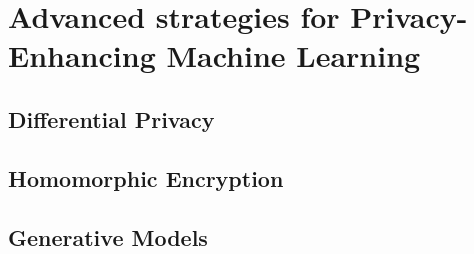 \chapter{Advanced strategies for Privacy-Enhancing Machine Learning}

\section{Differential Privacy}

\section{Homomorphic Encryption}

\section{Generative Models}

